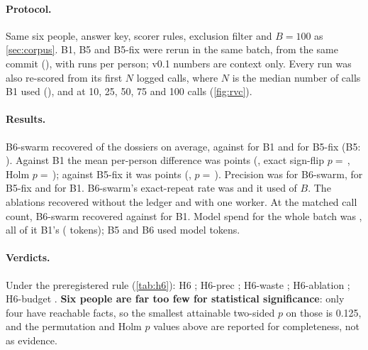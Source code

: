 \paragraph{Protocol.} Same six people, answer key, scorer rules, exclusion filter and $B=100$ as \cref{sec:corpus}. B1, B5 and B5-fix were rerun in the same batch, from the same commit (), with  runs per person; v0.1 numbers are context only. Every run was also re-scored from its first $N$ logged calls, where $N$ is the median number of calls B1 used (), and at 10, 25, 50, 75 and 100 calls (\cref{fig:rvc}).


\paragraph{Results.} B6-swarm recovered  of the dossiers on average, against  for B1 and  for B5-fix (B5: ). Against B1 the mean per-person difference was  points (, exact sign-flip $p=$\,, Holm $p=$\,); against B5-fix it was  points (, $p=$\,). Precision was  for B6-swarm,  for B5-fix and  for B1. B6-swarm's exact-repeat rate was  and it used  of $B$. The ablations recovered  without the ledger and  with one worker. At the matched call count, B6-swarm recovered  against  for B1. Model spend for the whole batch was , all of it B1's ( tokens); B5 and B6 used  model tokens.


\paragraph{Verdicts.} Under the preregistered rule (\cref{tab:h6}): H6 ; H6-prec ; H6-waste ; H6-ablation ; H6-budget . \textbf{Six people are far too few for statistical significance}: only four have reachable facts, so the smallest attainable two-sided $p$ on those is 0.125, and the permutation and Holm $p$ values above are reported for completeness, not as evidence.

